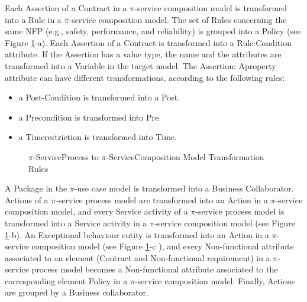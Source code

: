 Each {\sf Assertion} of a {\sf Contract} in a $\pi$-service composition model is transformed into a {\sf Rule} in a $\pi$-service composition model. The set of {\sf Rules}  concerning the same NFP (e.g., safety, performance, and reliability) is grouped into a {\sf Policy} (see Figure \ref{fig:ServiceProcess-ServiceComposition-Rules}-a). Each {\sf Assertion} of a {\sf Contract} is transformed into a {\sf Rule:Condition} attribute. If the {\sf Assertion} has a value type, the name and the attributes are transformed into a {\sf Variable} in the target model.  The {\sf Assertion: Aproperty} attribute can have different transformations, according to  the following rules:
\begin{itemize}
\item a {\sf Post-Condition} is transformed into a {\sf  Post}. 
\item a {\sf Precondition} is transformed into {\sf Pre}.
\item a {\sf Timerestriction} is transformed into {\sf Time}.
\end{itemize}


\begin{figure}
\caption{$\pi$-ServiceProcess to $\pi$-ServiceComposition Model Transformation Rules}
\label{fig:ServiceProcess-ServiceComposition-Rules}
\end{figure}

A {\sf Package}  in the $\pi$-use case model is transformed   into a {\sf Business Collaborator}. 
{\sf Actions}  of a $\pi$-service process model are transformed into an {\sf Action} in a $\pi$-service composition model, and every {\sf Service activity} of a $\pi$-service process model is transformed into a {\sf Service activity} in a $\pi$-service composition model (see Figure \ref{fig:ServiceProcess-ServiceComposition-Rules}-b). An {\sf Exceptional behaviour} entity is transformed into an {\sf Action} in a $\pi$-service composition model (see Figure \ref{fig:ServiceProcess-ServiceComposition-Rules}-c ), and every {\sf Non-functional attribute} associated to an element ({\sf Contract} and {\sf Non-functional requirement}) in a $\pi$-service process model becomes a {\sf Non-functional attribute} associated to the corresponding element {\sf Policy} in a $\pi$-service composition model.
 Finally, {\sf Actions} are grouped by  a  {\sf Business collaborator}.  

